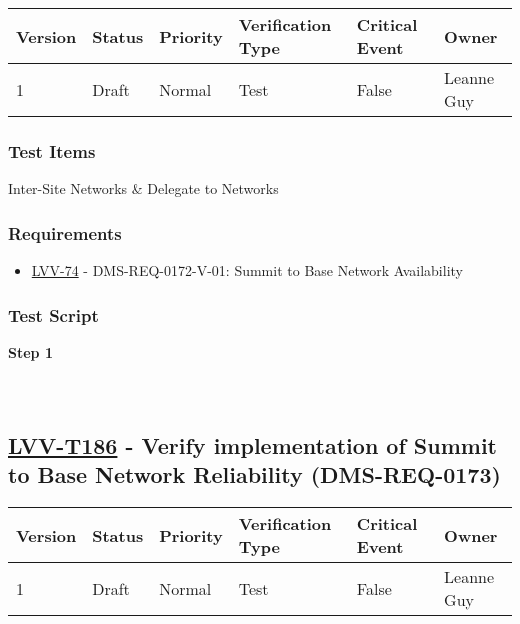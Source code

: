 \begin{longtable}[]{@{}llllll@{}}
\toprule
Version & Status & Priority & Verification Type & Critical Event &
Owner\tabularnewline
\midrule
\endhead
1 & Draft & Normal & Test & False & Leanne Guy\tabularnewline
\bottomrule
\end{longtable}

\hypertarget{test-items-161}{%
\subsubsection{Test Items}\label{test-items-161}}

Inter-Site Networks \& Delegate to Networks

\hypertarget{requirements-162}{%
\subsubsection{Requirements}\label{requirements-162}}

\begin{itemize}
\tightlist
\item
  \href{https://jira.lsstcorp.org/browse/LVV-74}{LVV-74} -
  DMS-REQ-0172-V-01: Summit to Base Network Availability
\end{itemize}

\hypertarget{test-script-162}{%
\subsubsection{Test Script}\label{test-script-162}}

\textbf{Step 1}\\
~\\
~\\

\hypertarget{lvv-t186---verify-implementation-of-summit-to-base-network-reliability-dms-req-0173}{%
\subsection{\texorpdfstring{\href{https://jira.lsstcorp.org/secure/Tests.jspa\#/testCase/LVV-T186}{LVV-T186}
- Verify implementation of Summit to Base Network Reliability
(DMS-REQ-0173)}{LVV-T186 - Verify implementation of Summit to Base Network Reliability (DMS-REQ-0173)}}\label{lvv-t186---verify-implementation-of-summit-to-base-network-reliability-dms-req-0173}}

\begin{longtable}[]{@{}llllll@{}}
\toprule
Version & Status & Priority & Verification Type & Critical Event &
Owner\tabularnewline
\midrule
\endhead
1 & Draft & Normal & Test & False & Leanne Guy\tabularnewline
\bottomrule
\end{longtable}

